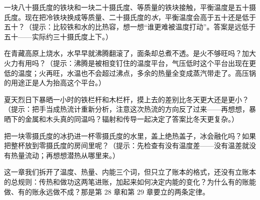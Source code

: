 \begin{puzzles}
\item 一块八十摄氏度的铁块和一块二十摄氏度、等质量的铁块接触，平衡温度是五十摄氏度。现在把冷铁块换成等质量、二十摄氏度的\emph{水}，平衡温度会高于五十还是低于五十？（提示：比较铁和水的比热容，想一想“谁更难被温度打动”。答案是远低于五十——实际约三十摄氏度上下。）
\item 在青藏高原上烧水，水早早就沸腾翻滚了，面条却总煮不透。是火不够旺吗？加大火力有用吗？（提示：沸腾是被相变钉住的温度平台，气压低时这个平台出现在更低的温度；火再旺，水温也不会超过沸点，多余的热量全变成蒸汽带走了。高压锅的用途正是人为抬高这个平台。）
\item 夏天烈日下暴晒一小时的铁栏杆和木栏杆，摸上去的差别比冬天更大还是更小？（提示：把手当成热流计重新分析，注意这次热流的方向反了过来——再想想，暴晒下的金属和木头真的同温吗？辐射和传导一起决定了答案比冬天更复杂。）
\item 把一块零摄氏度的冰扔进一杯零摄氏度的水里，盖上绝热盖子，冰会融化吗？如果把整杯放到零摄氏度的房间里呢？（提示：先检查有没有温度差——没有温差就没有热量流动；再想想潜热从哪里来。）
\end{puzzles}

这一章我们拆开了温度、热量、内能三个词，但只立了账本的格式，还没有立账本的总规则：传热和做功这两笔进账，加起来如何决定内能的变化？为什么有的账能做、有的账永远做不成？那是第 28 章和第 29 章要立的两条定律。
